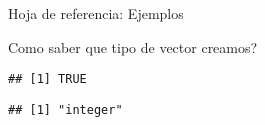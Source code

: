 \begin{frame}[fragile]{Hoja de referencia:  Ejemplos}
\begin{block}{Como saber que tipo de vector creamos?}
\begin{Shaded}
\begin{Highlighting}[]
\end{Highlighting}
\end{Shaded}

\begin{verbatim}
## [1] TRUE
\end{verbatim}

\begin{Shaded}
\begin{Highlighting}[]
\end{Highlighting}
\end{Shaded}

\begin{verbatim}
## [1] "integer"
\end{verbatim}
\end{block}
\end{frame}


